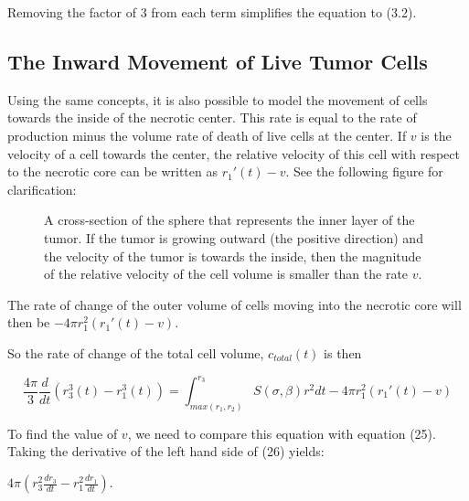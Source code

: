 \documentclass{article}
\begin{document}
Removing the factor of 3 from each term simplifies the equation to (3.2).

\subsection{The Inward Movement of Live Tumor Cells}

Using the same concepts, it is also possible to model the movement of cells towards the inside of the necrotic
center. This rate is equal to the rate of production minus the volume rate of death of live cells at the center.
If $v$ is the velocity of a cell towards the center, the relative velocity of this cell with respect to the necrotic core
can be written as $r_1'(t) - v$. See the following figure for clarification:

\begin{figure}[ht]
    \centering
    \caption{A cross-section of the sphere that represents the inner layer of the tumor. If the tumor is growing outward (the positive direction) and the velocity of the tumor is towards the inside,
        then the magnitude of the relative velocity of the cell volume is smaller than the rate $v$.}
    \label{fig:necrosis}
\end{figure}

The rate of change of the outer volume of cells moving into the necrotic core will then be $-4\pi r_1^2(r_1'(t) - v)$.

So the rate of change of the total cell volume, $c_{total}(t)$ is then

\begin{equation}
    \frac{4\pi}{3} \frac{d}{dt}(r_3^3(t)-r_1^3(t)) = \int_{max(r_1, r_2)}^{r_3} S(\sigma, \beta)r^2 dt -4\pi r_1^2(r_1'(t) - v)
\end{equation}

To find the value of $v$, we need to compare this equation with equation (25). Taking the derivative of the left hand side of (26) yields:

\vspace*{0.25cm}

$4\pi(r_3^2 \frac{dr_3}{dt} - r_1^2 \frac{dr_1}{dt})$.
\end{document}
